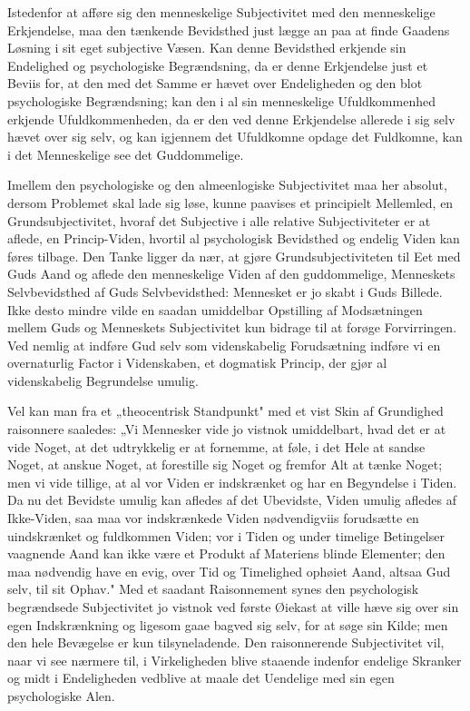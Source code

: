 \documentclass[12pt]{book}
\newcommand{\opage}[1]{\marginnote{\footnotesize\textit{[#1]}}}
\begin{document}
Istedenfor at afføre sig den menneskelige Subjectivitet med den menneskelige
Erkjendelse, maa den tænkende Bevidsthed just lægge an paa at finde Gaadens
Løsning i sit eget subjective Væsen. Kan denne Bevidsthed erkjende sin Endelighed
og psychologiske Begrændsning, da er denne Erkjendelse just et Beviis for, at den
med det Samme er hævet over Endeligheden og den blot psychologiske Begrændsning;
kan den i al sin menneskelige Ufuldkommenhed erkjende Ufuldkommenheden, da er den
ved denne Erkjendelse allerede i sig selv hævet over sig selv, og kan igjennem
det Ufuldkomne opdage det Fuldkomne, kan i det Menneskelige see det Guddommelige.

Imellem den psychologiske og den almeenlogiske Subjectivitet maa her absolut,
dersom Problemet skal lade sig løse, kunne paavises et principielt Mellemled, en
Grundsubjectivitet, hvoraf det Subjective i alle relative Subjectiviteter er at
aflede, en Princip-Viden, hvortil al psychologisk Bevidsthed og endelig Viden kan
føres tilbage. Den Tanke ligger da nær, at gjøre Grundsubjectiviteten til Eet med
Guds Aand og aflede den menneskelige Viden af den guddommelige, Menneskets
Selvbevidsthed af Guds Selvbevidsthed: Mennesket er jo skabt i Guds Billede. Ikke
desto mindre vilde en saadan umiddelbar Opstilling af Modsætningen mellem Guds og
Menneskets Subjectivitet kun bidrage til at forøge Forvirringen. Ved nemlig at
indføre Gud selv som videnskabelig Forudsætning indføre vi en overnaturlig Factor
i Videnskaben, et dogmatisk Princip, der gjør al videnskabelig Begrundelse
umulig.

Vel kan man fra et „theocentrisk Standpunkt" med et vist Skin af Grundighed
raisonnere saaledes:
\opage{43} „Vi Mennesker vide jo vistnok umiddelbart, hvad det er at vide Noget, at det
udtrykkelig er at fornemme, at føle, i det Hele at sandse Noget, at anskue Noget,
at forestille sig Noget og fremfor Alt at tænke Noget; men vi vide tillige, at al
vor Viden er indskrænket og har en Begyndelse i Tiden. Da nu det Bevidste umulig
kan afledes af det Ubevidste, Viden umulig afledes af Ikke-Viden, saa maa vor
indskrænkede Viden nødvendigviis forudsætte en uindskrænket og fuldkommen Viden;
vor i Tiden og under timelige Betingelser vaagnende Aand kan ikke være et Produkt
af Materiens blinde Elementer; den maa nødvendig have en evig, over Tid og
Timelighed ophøiet Aand, altsaa Gud selv, til sit Ophav." Med et saadant
Raisonnement synes den psychologisk begrændsede Subjectivitet jo vistnok ved
første Øiekast at ville hæve sig over sin egen Indskrænkning og ligesom gaae
bagved sig selv, for at søge sin Kilde; men den hele Bevægelse er kun
tilsyneladende. Den raisonnerende Subjectivitet vil, naar vi see nærmere til, i
Virkeligheden blive staaende indenfor endelige Skranker og midt i Endeligheden
vedblive at maale det Uendelige med sin egen psychologiske Alen.
\end{document}
